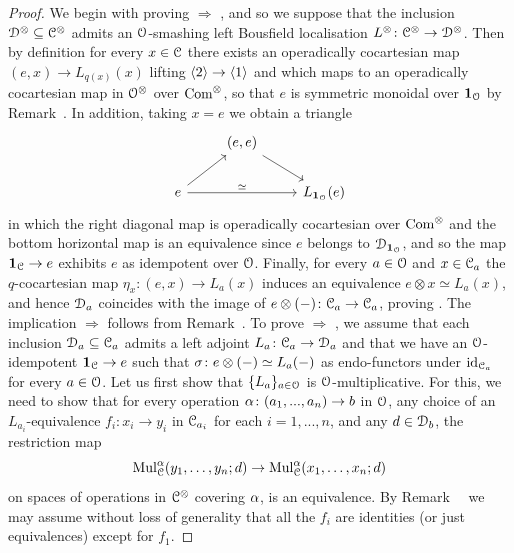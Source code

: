 \begin{proof}
We begin with proving  $\Rightarrow$ , and so we 
suppose that the inclusion $\mathcal{D}^{\otimes} \subseteq \mathcal C^{\otimes}$ admits an $\mathcal{O}$-smashing left Bousfield localisation $L^{\otimes}\colon \mathcal C^{\otimes} \to \mathcal{D}^{\otimes}$.
Then by definition for every $x \in \mathcal C$ there exists an operadically cocartesian map $(e,x) \to L_{q(x)}(x)$ lifting $\langle2\rangle \to \langle1\rangle$ and which maps to an operadically cocartesian map in $\mathcal{O}^{\otimes}$ over $\mathrm{Com}^{\otimes}$, so that $e$ is symmetric monoidal over $\mathbf{1}_{\mathcal{O}}$
by Remark~\;. In addition, taking $x = e$ we obtain a triangle
\[
\begin{tikzcd}
& (e,e) \ar[dr] & \\
e \ar[rr,"\simeq"]\ar[ur] && L_{\one_{\cO}}(e)
\end{tikzcd}
\]
in which the right diagonal map is operadically cocartesian over $\mathrm{Com}^{\otimes}$ and the bottom horizontal map is an equivalence since $e$ belongs to $\mathcal{D}_{\mathbf{1}_{\mathcal{O}}}$, and so the map $\mathbf{1}_{\mathcal C} \to e$ exhibits $e$ as idempotent over $\mathcal{O}$. Finally, for every $a \in \mathcal{O}$ and $x \in \mathcal C_a$ the $q$-cocartesian map $\eta_x \colon (e,x) \to L_a(x)$ induces an equivalence $e \otimes x \simeq L_a(x)$, and hence $\mathcal{D}_a$ coincides with the image of $e \otimes (-)\colon \mathcal C_a \to \mathcal C_a$, proving .
The implication  $\Rightarrow$  follows from Remark~. %
To prove  $\Rightarrow$ , we assume that each inclusion $\mathcal{D}_a \subseteq \mathcal C_a$ admits a left adjoint $L_a\colon \mathcal C_a \to \mathcal{D}_a$ and that we have an $\mathcal{O}$-idempotent $\mathbf{1}_{\mathcal C} \to e$ %
such that $\sigma\colon e \otimes (-) \simeq L_a(-)$ as endo-functors under $\mathrm{id}_{\mathcal C_a}$ for every $a \in \mathcal{O}$. Let us first show that $\{L_a\}_{a \in \mathcal{O}}$ is $\mathcal{O}$-multiplicative. For this, we need to show that for every operation $\alpha\colon (a_1,...,a_n) \to b$ in $\mathcal{O}$, any choice of an $L_{a_i}$-equivalence $f_i\colon x_i \to y_i$ in $\mathcal C_{a_i}$ for each $i=1,...,n$, and any $d \in \mathcal{D}_b$, the restriction map
\[
\mathrm{Mul}^{\alpha}_{\mathcal C}(y_1,\dots,y_n;d) \to \mathrm{Mul}^{\alpha}_{\mathcal C}(x_1,\dots,x_n; d)
\]
on spaces of operations in $\mathcal C^{\otimes}$ covering $\alpha$, is an equivalence. By Remark~~ we may assume without loss of generality that all the $f_i$ are identities (or just equivalences) except for $f_1$. 

\end{proof}
